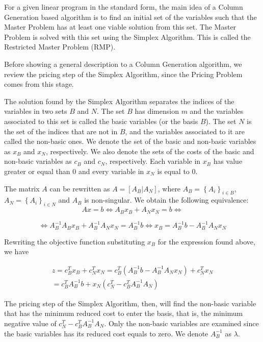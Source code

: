 \documentclass[fleqn,10pt]{SelfArx} %
\newcommand{\chaves}[1] {\ensuremath{{\left \{ {#1} \right \}}}}
\begin{document}
	For a given linear program in the standard form, the main idea of a
	Column Generation based algorithm is to find an initial set of the
	variables such that the Master Problem has at least one viable
	solution from this set. The Master Problem is solved with this set
	using the Simplex Algorithm. This is called the Restricted Master
	Problem (RMP).
	
	Before showing a general description to a Column Generation algorithm,
	we review the pricing step of the Simplex Algorithm, since the Pricing
	Problem comes from this stage.
	
	The solution found by the Simplex Algorithm separates the indices of
	the variables in two sets $B$ and $N$. The set $B$ has dimension $m$
	and the variables associated to this set is called the basic variables
	(or the basis $B$). The set $N$ is the set of the indices that are not
	in $B$, and the variables associated to it are called the non-basic
	ones. We denote the set of the basic and non-basic variables as $x_B$
	and $x_N$, respectively. We also denote the sets of the costs of the
	basic and non-basic variables as $c_B$ and $c_N$, respectively. Each
	variable in $x_B$ has value greater or equal than 0 and every variable
	in $x_N$ is equal to 0.
	
	The matrix $A$ can be rewritten as $A = [A_B|A_N]$, where $A_B = {\chaves{A_i}}_{i \in B}$, $A_N = {\chaves{A_i}}_{i \in N}$ and $A_B$ is
	non-singular. We obtain the following equivalence:
	\begin{equation*}
	Ax = b \iff A_{B}x_{B} + A_{N}x_{N} = b \iff
	\end{equation*}
	\begin{small}
	\begin{equation*}
	\iff A_{B}^{-1} A_{B}x_{B} + A_{B}^{-1} A_{N}x_{N} = A_{B}^{-1}b \iff x_{B} = A_{B}^{-1}b - A_{B}^{-1}A_{N}x_{N}
	\end{equation*}
	\end{small}
	Rewriting the objective function substituting $x_B$ for the expression
	found above, we have
	
	\begin{multline*}
	z = c_{B}^{T}x_{B} + c_{N}^{T}x_{N} = c_{B}^{T}(A_{B}^{-1}b - A_{B}^{-1}A_{N}x_{N}) + c_{N}^{T}x_{N} \\= c_{B}^{T}A_{B}^{-1}b + x_{N}(c_{N}^{T} - c_{B}^{T}A_{B}^{-1}A_{N})
	\end{multline*}
	
	The pricing step of the Simplex Algorithm, then, will find the
	non-basic variable that has the minimum reduced cost to enter the
	basis, that is, the minimum negative value of $c_{N}^{T} -
	c_{B}^{T}A_{B}^{-1}A_{N}$. Only the non-basic variables are examined since the
	basic variables has its reduced cost equals to zero. We denote
	$A_B^{-1}$ as $\lambda$.
	
\end{document}
